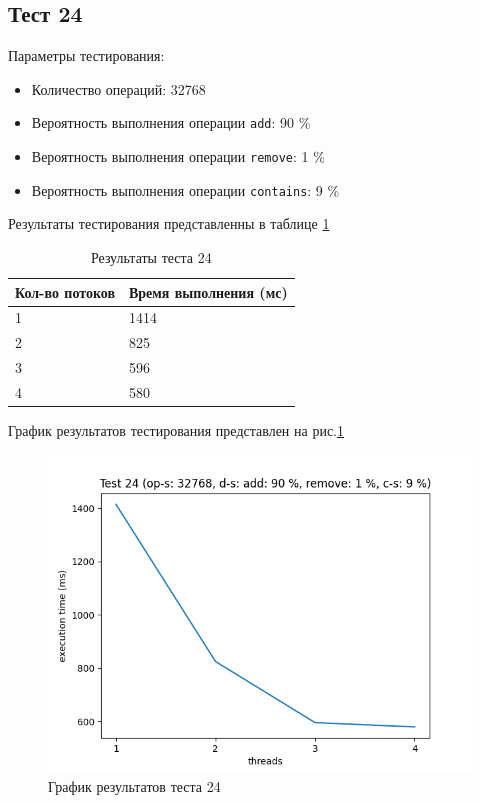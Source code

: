 \subsection*{Тест 24}

Параметры тестирования:

\begin{itemize}
    \item Количество операций: 32768
    \item Вероятность выполнения операции \verb|add|: 90 \%
    \item Вероятность выполнения операции \verb|remove|: 1 \%
    \item Вероятность выполнения операции \verb|contains|: 9 \%
\end{itemize}

Результаты тестирования представленны в таблице \ref{tab:results24}


\begin{table}[H]
    \centering
    \begin{tabular}{|l|l|}
        \hline
        Кол-во потоков & Время выполнения (мс) \\
        \hline
        1 & 1414 \\
        \hline
        2 & 825 \\
        \hline
        3 & 596 \\
        \hline
        4 & 580 \\
        \hline
    \end{tabular}
    \caption{Результаты теста 24}
    \label{tab:results24}
\end{table}
        

График результатов тестирования представлен на рис.\ref{fig:plot24}

\begin{figure}[H]
    \centering
    \includegraphics[width=0.7\linewidth]{photo/plot24}
    \caption{График результатов теста 24}
    \label{fig:plot24}
\end{figure}

